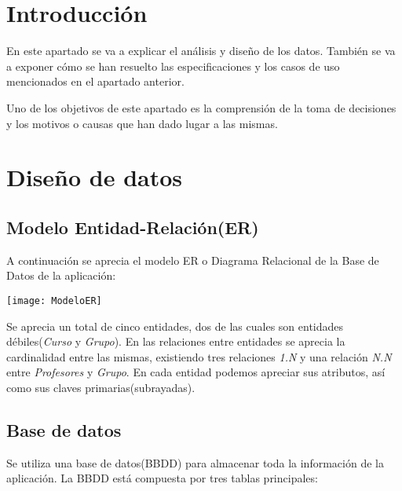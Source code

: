 
\section{Introducción}
En este apartado se va a explicar el análisis y diseño de los datos. También se va a exponer cómo se han resuelto las especificaciones y los casos de uso mencionados en el apartado anterior.  

Uno de los objetivos de este apartado es la comprensión  de la toma de decisiones y los motivos o causas que han dado lugar a las mismas.

\section{Diseño de datos}


\subsection{Modelo Entidad-Relación(ER)}
A continuación se aprecia el modelo ER o Diagrama Relacional de la Base de Datos de la aplicación:

\texttt{[image: ModeloER]}

Se aprecia un total de cinco entidades, dos de las cuales son entidades débiles(\emph{Curso} y \emph{Grupo}). En las relaciones entre entidades se aprecia la cardinalidad entre las mismas, existiendo tres relaciones \emph{1.N} y una relación \emph{N.N} entre \emph{Profesores} y \emph{Grupo}. En cada entidad podemos apreciar sus atributos, así como sus claves primarias(subrayadas).



\subsection{Base de datos}
Se utiliza una base de datos(BBDD) para almacenar toda la información de la aplicación. La BBDD está compuesta por tres tablas principales:



